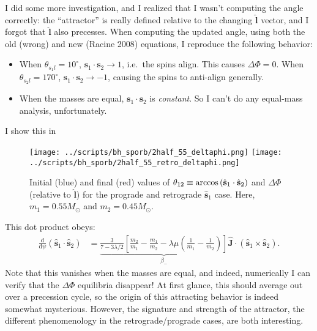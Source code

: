 \documentclass[11pt,
        usenames, %
        dvipsnames %
    ]{article}
\newcommand*{\rd}[2]{\frac{\mathrm{d}#1}{\mathrm{d}#2}}
\newcommand*{\bm}[1]{\boldsymbol{\mathbf{#1}}}
\newcommand*{\uv}[1]{\hat{\bm{#1}}}
\newcommand*{\p}[1]{\left(#1\right)}
\newcommand*{\s}[1]{\left[#1\right]}
\begin{document}
I did some more investigation, and I realized that I wasn't computing the angle
correctly: the ``attractor'' is really defined relative to the changing $\uv{l}$
vector, and I forgot that $\uv{l}$ also precesses. When computing the updated
angle, using both the old (wrong) and new (Racine 2008) equations, I reproduce
the following behavior:
\begin{itemize}
    \item When $\theta_{s_1l} = 10^\circ$, $\bm{s}_1 \cdot \bm{s}_2 \to 1$,
        i.e.\ the spins align. This causes $\Delta \Phi = 0$. When
        $\theta_{s_2l} = 170^\circ$, $\bm{s}_1 \cdot \bm{s}_2 \to -1$, causing
        the spins to anti-align generally.

    \item When the masses are equal, $\bm{s}_1 \cdot \bm{s}_2$ is
        \emph{constant}. So I can't do any equal-mass analysis, unfortunately.
\end{itemize}
I show this in
\begin{figure}
    \centering
    \texttt{[image: ../scripts/bh\_sporb/2half\_55\_deltaphi.png]}
    \texttt{[image: ../scripts/bh\_sporb/2half\_55\_retro\_deltaphi.png]}
    \caption{Initial (blue) and final (red) values of $\theta_{\rm 12} \equiv
    \arccos\p{\uv{s}_1 \cdot \uv{s}_2}$ and $\Delta \Phi$ (relative to
    $\uv{l}$) for the prograde and retrograde $\uv{s}_1$ case. Here, $m_1 =
    0.55M_{\odot}$ and $m_2 = 0.45M_{\odot}$.}\label{fig:2half55}
\end{figure}

This dot product obeys:
\begin{align}
    \rd{}{\psi}\p{\uv{s}_1 \cdot \uv{s}_2}
        &= \underbrace{\frac{3}{7 - 3\lambda/2}\s{
            \frac{m_2}{m_1} - \frac{m_1}{m_2}
            - \lambda\mu\p{\frac{1}{m_1} - \frac{1}{m_2}}}}_{\beta_-}
            \uv{J} \cdot \p{\uv{s}_1 \times \uv{s}_2}.
\end{align}
Note that this vanishes when the masses are equal, and indeed, numerically I can
verify that the $\Delta \Phi$ equilibria disappear! At first glance, this should
average out over a precession cycle, so the origin of this attracting behavior
is indeed somewhat mysterious. However, the signature and strength of the
attractor, the different phenomenology in the retrograde/prograde cases, are
both interesting.
\end{document}
